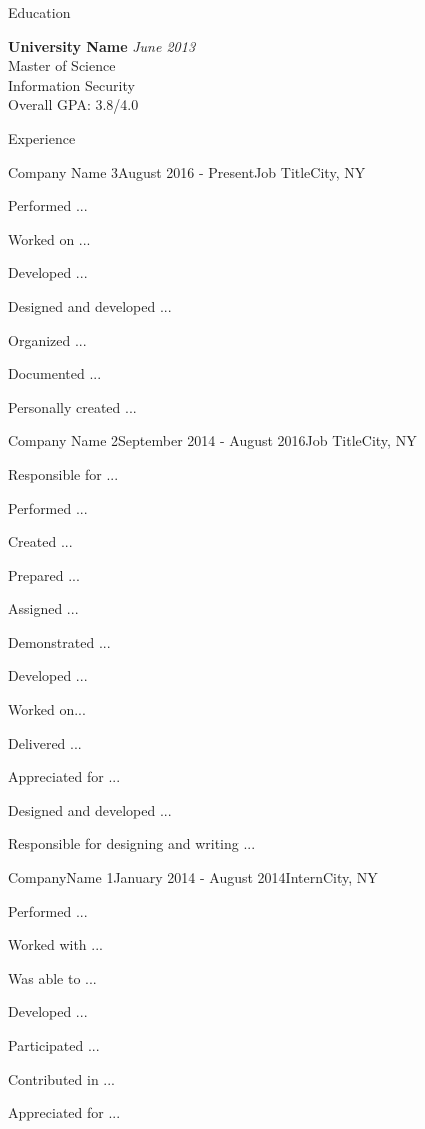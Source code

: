 \documentclass{customize} %
\begin{document}
\begin{rSection}{Education}

{\bf University Name} \hfill {\em June 2013} \\ 
Master of Science \\ %
Information Security \\ %
Overall GPA: 3.8/4.0 %

\end{rSection}


\begin{rSection}{Experience}

\begin{rSubsection}{Company Name 3}{August 2016 - Present}{Job Title}{City, NY} 
\item Performed ...
\item Worked on ...
\item Developed ...
\item Designed and developed ...   
\item Organized ...
\item Documented ... 
\item Personally created ...
\end{rSubsection}


\begin{rSubsection}{Company Name 2}{September 2014 - August 2016}{Job Title}{City, NY}
\item Responsible for ...
\item Performed ... 
\item Created ...
\item Prepared ...
\item Assigned ...
\item Demonstrated ...   
\item Developed ...
\item Worked on...
\item Delivered ...
\item Appreciated for ...
\item Designed and developed ...
\item Responsible for designing and writing ...
\end{rSubsection}


\begin{rSubsection}{CompanyName 1}{January 2014 - August 2014}{Intern}{City, NY}
\item Performed ...
\item Worked with ...
\item Was able to ...
\item Developed ...
\item Participated ...
\item Contributed in ...
\item Appreciated for ...
\end{rSubsection}

\end{rSection}
\end{document}
